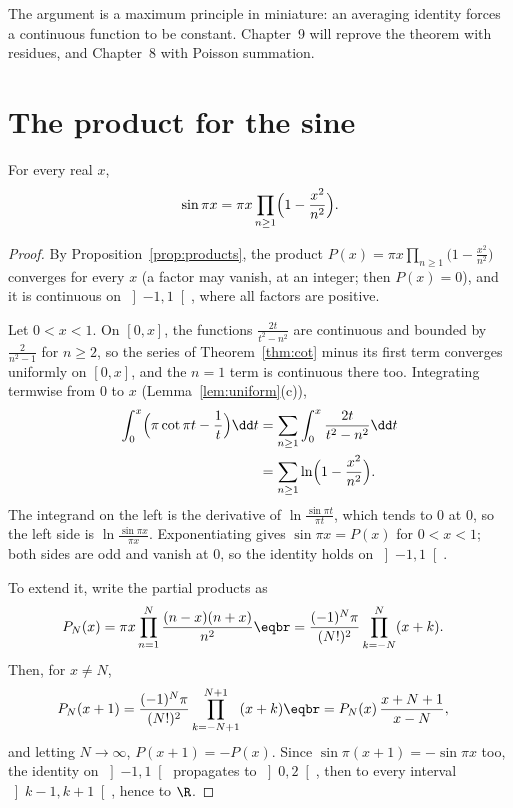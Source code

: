 The argument is a maximum principle in miniature: an averaging identity forces a continuous function to be constant.
Chapter~9 will reprove the theorem with residues, and Chapter~8 with Poisson summation.

\section{The product for the sine}

\begin{theorem}[Euler]\label{thm:sineproduct}
For every real $x$,
\[
\sin\pi x=\pi x\prod_{n\ge1}\Bigl(1-\frac{x^2}{n^2}\Bigr).
\]
\end{theorem}
\begin{proof}
By Proposition~\ref{prop:products}, the product $P(x)=\pi x\prod_{n\ge1}\bigl(1-\frac{x^2}{n^2}\bigr)$ converges for every $x$ (a
factor may vanish, at an integer; then $P(x)=0$), and it is continuous on $\left]-1,1\right[$, where all factors are positive.

Let $0<x<1$. On $[0,x]$, the functions $\frac{2t}{t^2-n^2}$ are continuous and bounded by $\frac2{n^2-1}$ for $n\ge2$, so the series
of Theorem~\ref{thm:cot} minus its first term converges uniformly on $[0,x]$, and the $n=1$ term is continuous there too.
Integrating termwise from $0$ to $x$ (Lemma~\ref{lem:uniform}(c)),
\[
\begin{aligned}\int_0^x\Bigl(\pi\cot\pi t-\frac1t\Bigr)\dd t&=\sum_{n\ge1}\int_0^x\frac{2t}{t^2-n^2}\dd t\\&=\sum_{n\ge1}\ln\Bigl(1-\frac{x^2}{n^2}\Bigr).\end{aligned}
\]
The integrand on the left is the derivative of $\ln\frac{\sin\pi t}{\pi t}$, which tends to $0$ at $0$, so the left side is
$\ln\frac{\sin\pi x}{\pi x}$. Exponentiating gives $\sin\pi x=P(x)$ for $0<x<1$; both sides are odd and vanish at $0$, so the
identity holds on $\left]-1,1\right[$.

To extend it, write the partial products as
\[
\begin{aligned}P_N(x)&=\pi x\prod_{n=1}^N\frac{(n-x)(n+x)}{n^2}\eqbr=\frac{(-1)^N\pi}{(N!)^2}\prod_{k=-N}^N(x+k).\end{aligned}
\]
Then, for $x\ne N$,
\[
\begin{aligned}P_N(x+1)&=\frac{(-1)^N\pi}{(N!)^2}\prod_{k=-N+1}^{N+1}(x+k)\eqbr=P_N(x)\,\frac{x+N+1}{x-N},\end{aligned}
\]
and letting $N\to\infty$, $P(x+1)=-P(x)$. Since $\sin\pi(x+1)=-\sin\pi x$ too, the identity on $\left]-1,1\right[$ propagates to
$\left]0,2\right[$, then to every interval $\left]k-1,k+1\right[$, hence to $\R$.
\end{proof}

